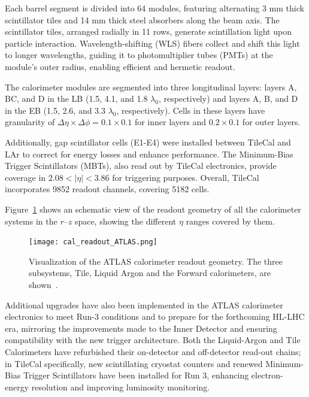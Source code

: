 Each barrel segment is divided into 64 modules, featuring alternating 3 mm thick scintillator tiles and 14 mm thick steel absorbers along the beam axis. The scintillator tiles, arranged radially in 11 rows, generate scintillation light upon particle interaction. Wavelength-shifting (WLS) fibers collect and shift this light to longer wavelengths, guiding it to photomultiplier tubes (PMTs) at the module's outer radius, enabling efficient and hermetic readout.

The calorimeter modules are segmented into three longitudinal layers: layers A, BC, and D in the LB (1.5, 4.1, and 1.8 $\lambda_0$, respectively) and layers A, B, and D in the EB (1.5, 2.6, and 3.3 $\lambda_0$, respectively). Cells in these layers have granularity of $\Delta\eta \times \Delta\phi=0.1\times0.1$ for inner layers and $0.2\times0.1$ for outer layers.

Additionally, gap scintillator cells (E1-E4) were installed between TileCal and LAr to correct for energy losses and enhance performance. The Minimum-Bias Trigger Scintillators (MBTs), also read out by TileCal electronics, provide coverage in $2.08<|\eta|<3.86$ for triggering purposes. Overall, TileCal incorporates 9852 readout channels, covering 5182 cells.

Figure~\ref{fig:cal_resum} shows an schematic view of the readout geometry of all the calorimeter systems in the $r$--$z$ space, showing the different $\eta$ ranges covered by them.
\begin{figure}[htbp]
    \centering
        \texttt{[image: cal\_readout\_ATLAS.png]}
    \caption{Visualization of the ATLAS calorimeter readout geometry. The three subsystems, Tile, Liquid Argon and the Forward calorimeters, are shown~\cite{Gessinger:2752944}.}
    \label{fig:cal_resum}
\end{figure}

\vspace{-0.3}

Additional upgrades have also been implemented in the ATLAS calorimeter electronics to meet Run-3 conditions and to prepare for the forthcoming HL-LHC era, mirroring the improvements made to the Inner Detector and ensuring compatibility with the new trigger architecture. Both the Liquid-Argon and Tile Calorimeters have refurbished their on-detector and off-detector read-out chains; in TileCal specifically, new scintillating cryostat counters and renewed Minimum-Bias Trigger Scintillators have been installed for Run 3, enhancing electron-energy resolution and improving luminosity monitoring.

